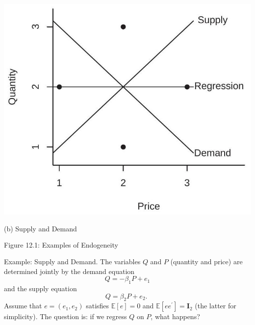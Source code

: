 \documentclass[10pt]{article}
\begin{document}
\includegraphics[max width=\textwidth]{2022_09_17_f9391324ededdbb7a34eg-03(1)}

(b) Supply and Demand

Figure 12.1: Examples of Endogeneity

Example: Supply and Demand. The variables $Q$ and $P$ (quantity and price) are determined jointly by the demand equation
$$
Q=-\beta_{1} P+e_{1}
$$
and the supply equation
$$
Q=\beta_{2} P+e_{2} \text {. }
$$
Assume that $e=\left(e_{1}, e_{2}\right)$ satisfies $\mathbb{E}[e]=0$ and $\mathbb{E}\left[e e^{\prime}\right]=\boldsymbol{I}_{2}$ (the latter for simplicity). The question is: if we regress $Q$ on $P$, what happens?
\end{document}

